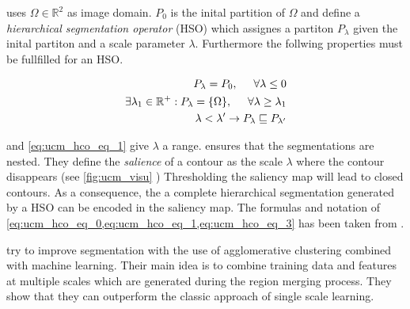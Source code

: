 \citet{ arbelaez_2006_cvpr} uses $\Omega \in \mathbb{R}^2$ as image domain.
$P_0$ is the inital partition of $\Omega$ and define a
\emph{hierarchical segmentation operator} (HSO) which
assignes a partiton $P_\lambda$ given the inital partiton and
a scale parameter $\lambda$.
Furthermore the follwing properties must be fullfilled for an HSO.  


\begin{align} 
P_{\lambda}  =  P_0 ,\hspace{0.5cm}  \forall \lambda \leq 0  \label{eq:ucm_hco_eq_0} \\ 
\exists \lambda_1 \in \mathbb{R}^+  : P_{\lambda}  =  \{ \Omega \} ,\hspace{0.5cm} \forall \lambda \geq \lambda_1  \label{eq:ucm_hco_eq_1} \\
\lambda < \lambda'  \rightarrow  P_{\lambda} \sqsubseteq   P_{\lambda'} \label{eq:ucm_hco_eq_2}
\end{align}


 and \cref{eq:ucm_hco_eq_1}  give $\lambda$ a range.
 ensures that the segmentations are nested.
They define the \emph{salience} of a contour as the scale $\lambda$ where
the contour disappears (see \cref{fig:ucm_visu} )
Thresholding the saliency map will lead to closed contours.
As a consequence, the a complete hierarchical segmentation
generated by a HSO can be encoded in the saliency map.
The formulas and notation of \cref{eq:ucm_hco_eq_0,eq:ucm_hco_eq_1,eq:ucm_hco_eq_3}
has been taken from \citep{ arbelaez_2006_cvpr}.


\citet{iglesias_2013} try to improve segmentation with
the use of agglomerative clustering combined with machine learning.
Their main idea is to combine training data and features at multiple scales
which are generated during the region merging process.
They show that they can outperform the classic approach
of single scale learning.


